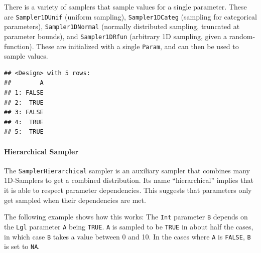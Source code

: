 \documentclass[
]{scrbook}
\newenvironment{Shaded}{\begin{snugshade}}{\end{snugshade}}
\newcommand{\DecValTok}[1]{\textcolor[rgb]{0.00,0.00,0.81}{#1}}
\newcommand{\FunctionTok}[1]{\textcolor[rgb]{0.00,0.00,0.00}{#1}}
\newcommand{\NormalTok}[1]{#1}
\newcommand{\OtherTok}[1]{\textcolor[rgb]{0.56,0.35,0.01}{#1}}
\newcommand{\SpecialCharTok}[1]{\textcolor[rgb]{0.00,0.00,0.00}{#1}}
\renewenvironment{Shaded} {\begin{snugshade}\small} {\end{snugshade}}
\begin{document}
There is a variety of samplers that sample values for a single parameter.
These are \texttt{Sampler1DUnif} (uniform sampling), \texttt{Sampler1DCateg} (sampling for categorical parameters), \texttt{Sampler1DNormal} (normally distributed sampling, truncated at parameter bounds), and \texttt{Sampler1DRfun} (arbitrary 1D sampling, given a random-function).
These are initialized with a single \texttt{Param}, and can then be used to sample values.

\begin{Shaded}
\end{Shaded}

\begin{verbatim}
## <Design> with 5 rows:
##        A
## 1: FALSE
## 2:  TRUE
## 3: FALSE
## 4:  TRUE
## 5:  TRUE
\end{verbatim}

\hypertarget{hierarchical-sampler}{%
\paragraph{Hierarchical Sampler}\label{hierarchical-sampler}}

The \texttt{SamplerHierarchical} sampler is an auxiliary sampler that combines many 1D-Samplers to get a combined distribution.
Its name ``hierarchical'' implies that it is able to respect parameter dependencies.
This suggests that parameters only get sampled when their dependencies are met.

The following example shows how this works: The \texttt{Int} parameter \texttt{B} depends on the \texttt{Lgl} parameter \texttt{A} being \texttt{TRUE}.
\texttt{A} is sampled to be \texttt{TRUE} in about half the cases, in which case \texttt{B} takes a value between 0 and 10.
In the cases where \texttt{A} is \texttt{FALSE}, \texttt{B} is set to \texttt{NA}.
\end{document}
